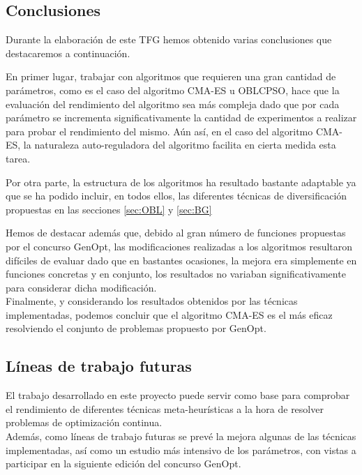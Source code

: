 
\subsection{Conclusiones}

Durante la elaboración de este TFG hemos obtenido varias conclusiones que destacaremos a continuación.

En primer lugar, trabajar con algoritmos que requieren una gran cantidad de parámetros, como es el caso del algoritmo CMA-ES u OBLCPSO, hace que la evaluación del rendimiento del algoritmo sea más compleja dado que por cada parámetro se incrementa significativamente la cantidad de experimentos a realizar para probar el rendimiento del mismo. Aún así, en el caso del algoritmo CMA-ES, la naturaleza auto-reguladora del algoritmo facilita en cierta medida esta tarea. 

Por otra parte, la estructura de los algoritmos ha resultado bastante adaptable ya que se ha podido incluir, en todos ellos, las diferentes técnicas de diversificación propuestas en las secciones \ref{sec:OBL} y \ref{sec:BG}

Hemos de destacar además que, debido al gran número de funciones propuestas por el concurso GenOpt, las modificaciones realizadas a los algoritmos resultaron difíciles de evaluar dado que en bastantes ocasiones, la mejora era simplemente en funciones concretas y en conjunto, los resultados no variaban significativamente para considerar dicha modificación.\\

Finalmente, y considerando los resultados obtenidos por las técnicas implementadas, podemos concluir que el algoritmo CMA-ES es el más eficaz resolviendo el conjunto de problemas propuesto por GenOpt.


\subsection{Líneas de trabajo futuras}

El trabajo desarrollado en este proyecto puede servir como base para comprobar el rendimiento de diferentes técnicas meta-heurísticas a la hora de resolver problemas de optimización continua. \\
Además, como líneas de trabajo futuras se prevé la mejora algunas de las técnicas implementadas, así como un estudio más intensivo de los parámetros, con vistas a participar en la siguiente edición del concurso GenOpt.